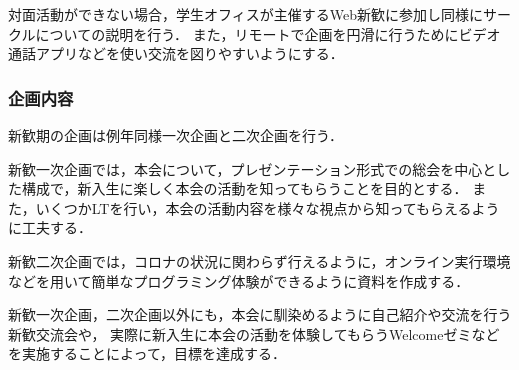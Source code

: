 対面活動ができない場合，学生オフィスが主催するWeb新歓に参加し同様にサークルについての説明を行う．
また，リモートで企画を円滑に行うためにビデオ通話アプリなどを使い交流を図りやすいようにする．

\subsubsection*{企画内容}
新歓期の企画は例年同様一次企画と二次企画を行う．

新歓一次企画では，本会について，プレゼンテーション形式での総会を中心とした構成で，新入生に楽しく本会の活動を知ってもらうことを目的とする．
また，いくつかLTを行い，本会の活動内容を様々な視点から知ってもらえるように工夫する．

新歓二次企画では，コロナの状況に関わらず行えるように，オンライン実行環境などを用いて簡単なプログラミング体験ができるように資料を作成する．

新歓一次企画，二次企画以外にも，本会に馴染めるように自己紹介や交流を行う新歓交流会や，
実際に新入生に本会の活動を体験してもらうWelcomeゼミなどを実施することによって，目標を達成する．
